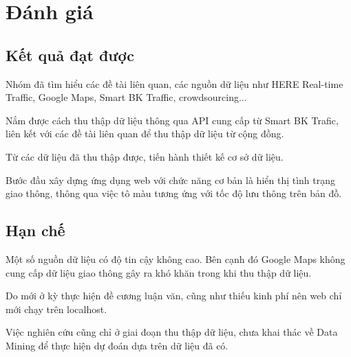 
\chapter{Đánh giá} %

\label{Chapter7}

\section{Kết quả đạt được}
Nhóm đã tìm hiểu các đề tài liên quan, các nguồn dữ liệu như HERE Real-time Traffic, Google Maps, Smart BK Traffic, crowdsourcing...

Nắm được cách thu thập dữ liệu thông qua API cung cấp từ Smart BK Trafic, liên kết với các đề tài liên quan để thu thập dữ liệu từ cộng đồng.

Từ các dữ liệu đã thu thập được, tiến hành thiết kế cơ sở dữ liệu.

Bước đầu xây dựng ứng dụng web với chức năng cơ bản là hiển thị tình trạng giao thông, thông qua việc tô màu tương ứng với tốc độ lưu thông trên bản đồ.

\section{Hạn chế}
Một số nguồn dữ liệu có độ tin cậy không cao. Bên cạnh đó Google Maps không cung cấp dữ liệu giao thông gây ra khó khăn trong khi thu thập dữ liệu.

Do mới ở kỳ thực hiện đề cương luận văn, cũng như thiếu kinh phí nên web chỉ mới chạy trên localhost.

Việc nghiên cứu cũng chỉ ở giai đoạn thu thập dữ liệu, chưa khai thác về Data Mining để thực hiện dự đoán dựa trên dữ liệu đã có.